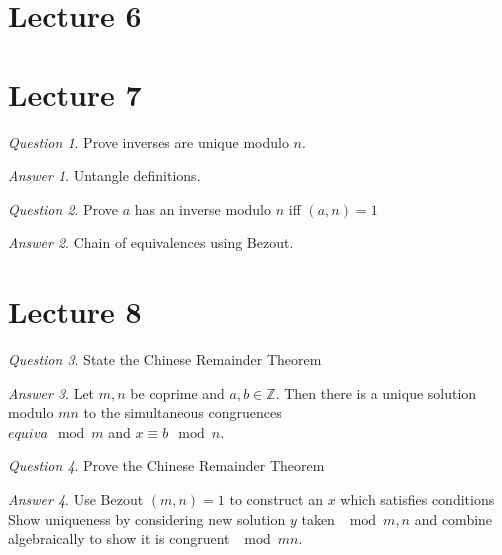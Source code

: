 \documentclass[]{article}
\def\integers{\mathbb{Z}}
\theoremstyle{remark}
\theoremstyle{qnstyle}
\newtheorem{question}{Question}
\theoremstyle{answerstyle}
\newtheorem*{answer}{Answer}
\begin{document}
\section* {Lecture 6}






\section* {Lecture 7}

\begin{question}
    Prove inverses are unique modulo $n$.
\end{question}
\begin{answer} 
    Untangle definitions.
\end{answer}

\begin{question}
    Prove $a$ has an inverse modulo $n$ iff $(a,n) = 1$
\end{question}
\begin{answer} 
    Chain of equivalences using Bezout.
\end{answer}






\section* {Lecture 8}

\begin{question}
    State the Chinese Remainder Theorem
\end{question}
\begin{answer}
    Let $m,n$ be coprime and $a,b \in \integers$.
    Then there is a unique solution modulo $mn$ 
    to the simultaneous congruences\\
    $ equiv a \mod m$ and $x \equiv b \mod n$.
\end{answer}

\begin{question}
    Prove the Chinese Remainder Theorem
\end{question}
\begin{answer}
    Use Bezout $(m,n) = 1$ to construct an $x$ which satisfies conditions
    Show uniqueness by considering new solution $y$ taken $\mod m,n$ and combine 
    algebraically to show it is congruent $\mod mn$.
\end{answer}
\end{document}
